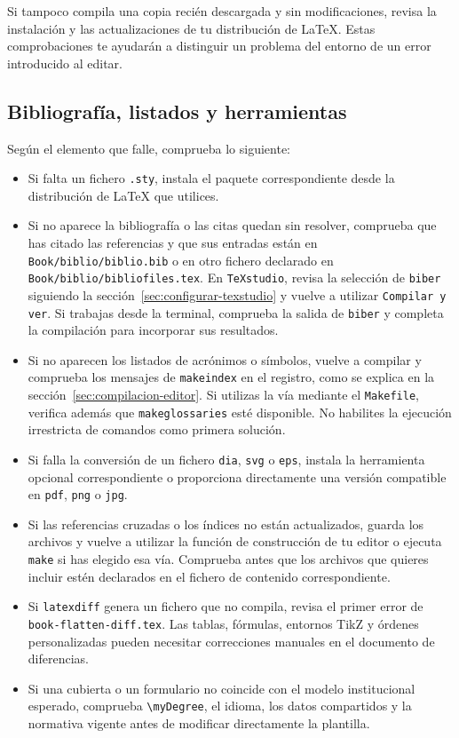 Si tampoco compila una copia recién descargada y sin modificaciones, revisa la instalación y las actualizaciones de tu distribución de \LaTeX{}. Estas comprobaciones te ayudarán a distinguir un problema del entorno de un error introducido al editar.

\subsection{Bibliografía, listados y herramientas}
\label{sec:diagnostico-bibliografia-listados}

Según el elemento que falle, comprueba lo siguiente:

\begin{itemize}
  \item Si falta un fichero \texttt{.sty}, instala el paquete correspondiente desde la distribución de \LaTeX{} que utilices.
  \item Si no aparece la bibliografía o las citas quedan sin resolver, comprueba que has citado las referencias y que sus entradas están en \texttt{Book/biblio/biblio.bib} o en otro fichero declarado en \texttt{Book/biblio/bibliofiles.tex}. En \texttt{TeXstudio}, revisa la selección de \texttt{biber} siguiendo la sección~\ref{sec:configurar-texstudio} y vuelve a utilizar \texttt{Compilar y ver}. Si trabajas desde la terminal, comprueba la salida de \texttt{biber} y completa la compilación para incorporar sus resultados.
  \item Si no aparecen los listados de acrónimos o símbolos, vuelve a compilar y comprueba los mensajes de \texttt{makeindex} en el registro, como se explica en la sección~\ref{sec:compilacion-editor}. Si utilizas la vía mediante el \texttt{Makefile}, verifica además que \texttt{makeglossaries} esté disponible. No habilites la ejecución irrestricta de comandos como primera solución.
  \item Si falla la conversión de un fichero \texttt{dia}, \texttt{svg} o \texttt{eps}, instala la herramienta opcional correspondiente o proporciona directamente una versión compatible en \texttt{pdf}, \texttt{png} o \texttt{jpg}.
  \item Si las referencias cruzadas o los índices no están actualizados, guarda los archivos y vuelve a utilizar la función de construcción de tu editor o ejecuta \texttt{make} si has elegido esa vía. Comprueba antes que los archivos que quieres incluir estén declarados en el fichero de contenido correspondiente.
  \item Si \texttt{latexdiff} genera un fichero que no compila, revisa el primer error de \texttt{book-flatten-diff.tex}. Las tablas, fórmulas, entornos TikZ y órdenes personalizadas pueden necesitar correcciones manuales en el documento de diferencias.
  \item Si una cubierta o un formulario no coincide con el modelo institucional esperado, comprueba \texttt{\textbackslash{}myDegree}, el idioma, los datos compartidos y la normativa vigente antes de modificar directamente la plantilla.
\end{itemize}


